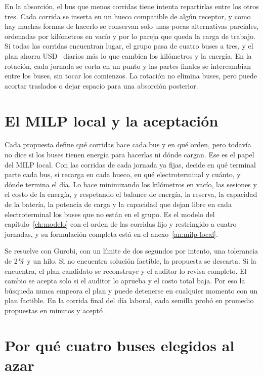 En la absorción, el bus que menos corridas tiene intenta repartirlas entre los otros tres. Cada corrida se inserta en un hueco compatible de algún receptor, y como hay muchas formas de hacerlo se conservan solo unas pocas alternativas parciales, ordenadas por kilómetros en vacío y por lo pareja que queda la carga de trabajo. Si todas las corridas encuentran lugar, el grupo pasa de cuatro buses a tres, y el plan ahorra USD~\CostoBus{} diarios más lo que cambien los kilómetros y la energía. En la rotación, cada jornada se corta en un punto y las partes finales se intercambian entre los buses, sin tocar los comienzos. La rotación no elimina buses, pero puede acortar traslados o dejar espacio para una absorción posterior.

\section{El MILP local y la aceptación}
\label{sec:milp-local}

Cada propuesta define qué corridas hace cada bus y en qué orden, pero todavía no dice si los buses tienen energía para hacerlas ni dónde cargan. Ese es el papel del MILP local. Con las corridas de cada jornada ya fijas, decide en qué terminal parte cada bus, si recarga en cada hueco, en qué electroterminal y cuánto, y dónde termina el día. Lo hace minimizando los kilómetros en vacío, las sesiones y el costo de la energía, y respetando el balance de energía, la reserva, la capacidad de la batería, la potencia de carga y la capacidad que dejan libre en cada electroterminal los buses que no están en el grupo. Es el modelo del capítulo~\ref{ch:modelo} con el orden de las corridas fijo y restringido a cuatro jornadas, y su formulación completa está en el anexo~\ref{an:milp-local}.

Se resuelve con Gurobi, con un límite de dos segundos por intento, una tolerancia de 2\,\% y un hilo. Si no encuentra solución factible, la propuesta se descarta. Si la encuentra, el plan candidato se reconstruye y el auditor lo revisa completo. El cambio se acepta solo si el auditor lo aprueba y el costo total baja. Por eso la búsqueda nunca empeora el plan y puede detenerse en cualquier momento con un plan factible. En la corrida final del día laboral, cada semilla probó en promedio \IntentosCuartetos{} propuestas en \MinutosFinal{} minutos y aceptó \MejorasCuartetos.

\section{Por qué cuatro buses elegidos al azar}
\label{sec:por-que-cuartetos}

